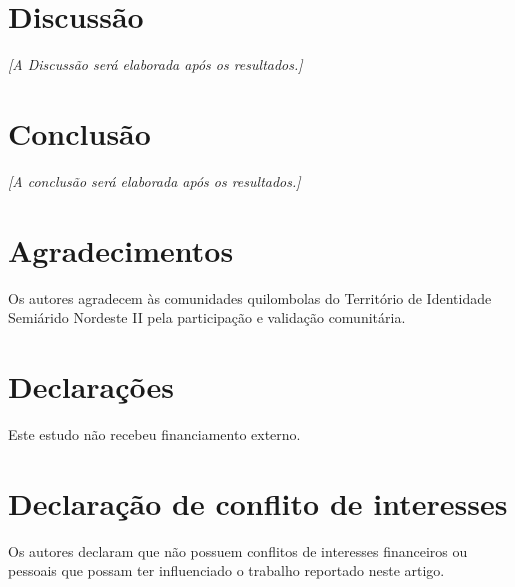 \documentclass[preprint,12pt,authoryear]{elsarticle}
\begin{document}
\section{Discussão}
\label{sec:discussion}

\textit{[A Discussão será elaborada após os resultados.]}




\section{Conclusão}
\label{sec:conclusions}

\textit{[A conclusão será elaborada após os resultados.]}


\section*{Agradecimentos}
Os autores agradecem às comunidades quilombolas do Território de Identidade Semiárido Nordeste II pela participação e validação comunitária.

\section*{Declarações}

Este estudo não recebeu financiamento externo.




\section*{Declaração de conflito de interesses}

Os autores declaram que não possuem conflitos de interesses financeiros ou pessoais que possam ter influenciado o trabalho reportado neste artigo.


\end{document}
